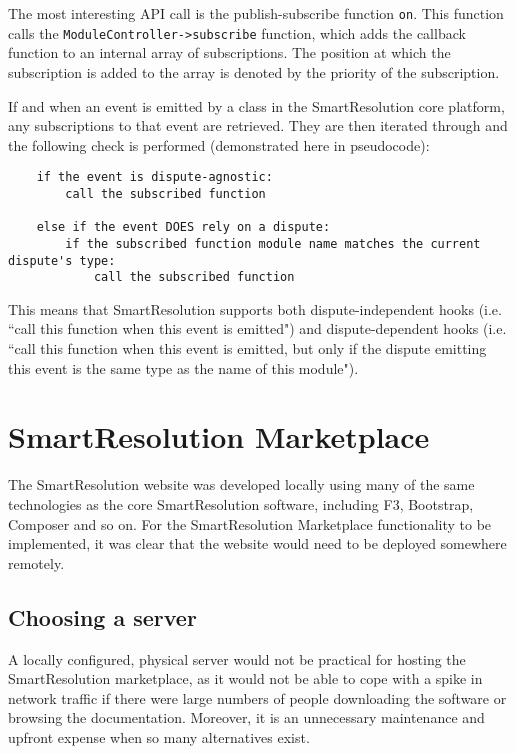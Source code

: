 The most interesting API call is the publish-subscribe function \lstinline{on}. This function calls the \lstinline{ModuleController->subscribe} function, which adds the callback function to an internal array of subscriptions. The position at which the subscription is added to the array is denoted by the priority of the subscription.

If and when an event is emitted by a class in the SmartResolution core platform, any subscriptions to that event are retrieved. They are then iterated through and the following check is performed (demonstrated here in pseudocode):

\begin{lstlisting}
	if the event is dispute-agnostic:
	    call the subscribed function
	
	else if the event DOES rely on a dispute:
	    if the subscribed function module name matches the current dispute's type:
	        call the subscribed function
\end{lstlisting}

This means that SmartResolution supports both dispute-independent hooks (i.e. ``call this function when this event is emitted") and dispute-dependent hooks (i.e. ``call this function when this event is emitted, but only if the dispute emitting this event is the same type as the name of this module"). 

\section{SmartResolution Marketplace}

The SmartResolution website was developed locally using many of the same technologies as the core SmartResolution software, including F3, Bootstrap, Composer and so on. For the SmartResolution Marketplace functionality to be implemented, it was clear that the website would need to be deployed somewhere remotely.

\subsection{Choosing a server}

A locally configured, physical server would not be practical for hosting the SmartResolution marketplace, as it would not be able to cope with a spike in network traffic if there were large numbers of people downloading the software or browsing the documentation. Moreover, it is an unnecessary maintenance and upfront expense when so many alternatives exist.

